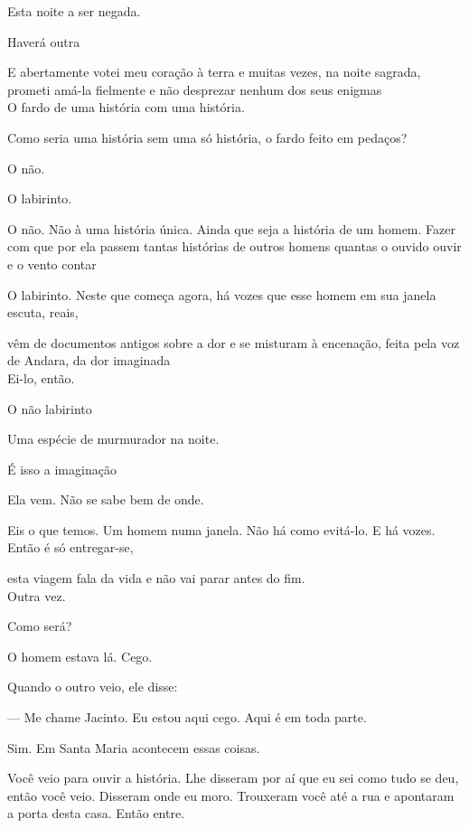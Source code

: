 Esta noite a ser negada.

Haverá outra

E abertamente votei meu coração à terra e muitas vezes, na noite
sagrada, prometi amá-la fielmente e não desprezar nenhum dos seus
enigmas\\

O fardo de uma história com uma história.

Como seria uma história sem uma só história, o fardo feito em pedaços?

O não.

O labirinto.

O não. Não à uma história única. Ainda que seja a história de um homem.
Fazer com que por ela passem tantas histórias de outros homens quantas o
ouvido ouvir e o vento contar

O labirinto. Neste que começa agora, há vozes que esse homem em sua
janela escuta, reais,

vêm de documentos antigos sobre a dor e se misturam à encenação, feita
pela voz de Andara, da dor imaginada\\

Ei-lo, então.

O não labirinto

\pagebreak

\vspace*{4cm}

Uma espécie de murmurador na noite.

É isso a imaginação

Ela vem. Não se sabe bem de onde.

Eis o que temos. Um homem numa janela. Não há como evitá-lo. E há vozes.
Então é só entregar-se,

esta viagem fala da vida e não vai parar antes do fim.\\

Outra vez.

Como será?

\pagebreak

\vspace*{4cm}

O homem estava lá. Cego.

Quando o outro veio, ele disse:

--- Me chame Jacinto. Eu estou aqui cego. Aqui é em toda parte.

Sim. Em Santa Maria acontecem essas coisas.

Você veio para ouvir a história. Lhe disseram por aí que eu sei como
tudo se deu, então você veio. Disseram onde eu moro. Trouxeram você até
a rua e apontaram a porta desta casa. Então entre.

